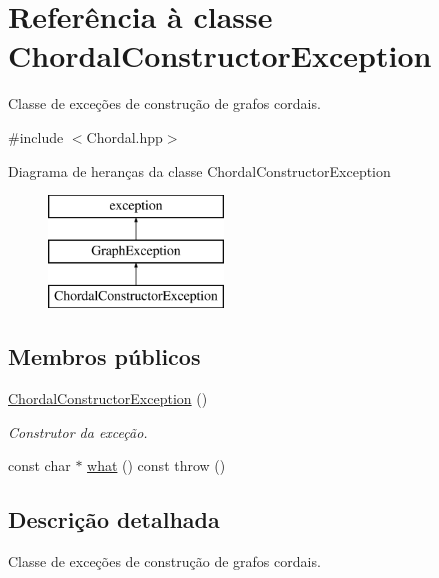 \hypertarget{classChordalConstructorException}{}\section{Referência à classe Chordal\+Constructor\+Exception}
\label{classChordalConstructorException}


Classe de exceções de construção de grafos cordais.  




{\ttfamily \#include $<$Chordal.\+hpp$>$}

Diagrama de heranças da classe Chordal\+Constructor\+Exception\begin{figure}[H]
\begin{center}
\leavevmode
\includegraphics[height=3.000000cm]{classChordalConstructorException}
\end{center}
\end{figure}
\subsection*{Membros públicos}
\begin{DoxyCompactItemize}
\item 
\mbox{\label{classChordalConstructorException_a7b884c1b0146128227fc27162f2820c5}} 
\mbox{\hyperlink{classChordalConstructorException_a7b884c1b0146128227fc27162f2820c5}{Chordal\+Constructor\+Exception}} ()
\begin{DoxyCompactList}\small\item\em Construtor da exceção. \end{DoxyCompactList}\item 
const char $\ast$ \mbox{\hyperlink{classChordalConstructorException_af45168f68f01e0b7cd98d8e82306a49b}{what}} () const  throw ()
\end{DoxyCompactItemize}


\subsection{Descrição detalhada}
Classe de exceções de construção de grafos cordais. 

